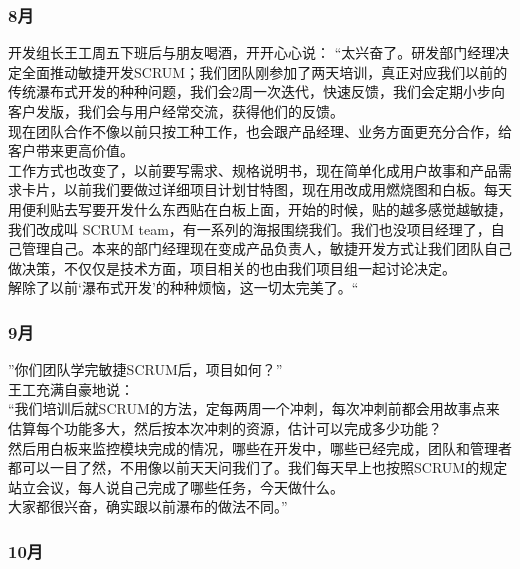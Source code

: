 \hypertarget{ux6708-1}{%
\subsubsection{8月}\label{ux6708-1}}

开发组长王工周五下班后与朋友喝酒，开开心心说： “太兴奋了。研发部门经理决定全面推动敏捷开发SCRUM；我们团队刚参加了两天培训，真正对应我们以前的传统瀑布式开发的种种问题，我们会2周一次迭代，快速反馈，我们会定期小步向客户发版，我们会与用户经常交流，获得他们的反馈。\\
现在团队合作不像以前只按工种工作，也会跟产品经理、业务方面更充分合作，给客户带来更高价值。\\
工作方式也改变了，以前要写需求、规格说明书，现在简单化成用户故事和产品需求卡片，以前我们要做过详细项目计划甘特图，现在用改成用燃烧图和白板。每天用便利贴去写要开发什么东西贴在白板上面，开始的时候，贴的越多感觉越敏捷，我们改成叫 SCRUM team，有一系列的海报围绕我们。我们也没项目经理了，自己管理自己。本来的部门经理现在变成产品负责人，敏捷开发方式让我们团队自己做决策，不仅仅是技术方面，项目相关的也由我们项目组一起讨论决定。\\
解除了以前‘瀑布式开发’的种种烦恼，这一切太完美了。“\\

\hypertarget{ux6708-2}{%
\subsubsection{9月}\label{ux6708-2}}

”你们团队学完敏捷SCRUM后，项目如何？”\\
王工充满自豪地说：\\
“我们培训后就SCRUM的方法，定每两周一个冲刺，每次冲刺前都会用故事点来估算每个功能多大，然后按本次冲刺的资源，估计可以完成多少功能？\\
然后用白板来监控模块完成的情况，哪些在开发中，哪些已经完成，团队和管理者都可以一目了然，不用像以前天天问我们了。我们每天早上也按照SCRUM的规定站立会议，每人说自己完成了哪些任务，今天做什么。\\
大家都很兴奋，确实跟以前瀑布的做法不同。”\\

\hypertarget{ux6708-3}{%
\subsubsection{10月}\label{ux6708-3}}

